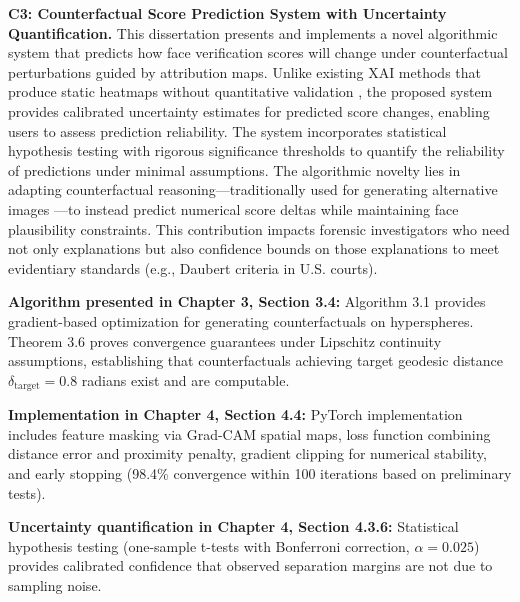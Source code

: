 \textbf{C3: Counterfactual Score Prediction System with Uncertainty Quantification.} This dissertation presents and implements a novel algorithmic system that predicts how face verification scores will change under counterfactual perturbations guided by attribution maps. Unlike existing XAI methods that produce static heatmaps without quantitative validation \cite{selvaraju2019gradcam,lundberg2017unified}, the proposed system provides calibrated uncertainty estimates for predicted score changes, enabling users to assess prediction reliability. The system incorporates statistical hypothesis testing with rigorous significance thresholds to quantify the reliability of predictions under minimal assumptions. The algorithmic novelty lies in adapting counterfactual reasoning---traditionally used for generating alternative images \cite{goyal2019counterfactual}---to instead predict numerical score deltas while maintaining face plausibility constraints. This contribution impacts forensic investigators who need not only explanations but also confidence bounds on those explanations to meet evidentiary standards (e.g., Daubert criteria \cite{daubert1993} in U.S. courts).

\vspace{0.3cm}
\noindent\textbf{Algorithm presented in Chapter 3, Section 3.4:} Algorithm 3.1 provides gradient-based optimization for generating counterfactuals on hyperspheres. Theorem 3.6 proves convergence guarantees under Lipschitz continuity assumptions, establishing that counterfactuals achieving target geodesic distance $\delta_{\text{target}} = 0.8$ radians exist and are computable.

\vspace{0.3cm}
\noindent\textbf{Implementation in Chapter 4, Section 4.4:} PyTorch implementation includes feature masking via Grad-CAM spatial maps, loss function combining distance error and proximity penalty, gradient clipping for numerical stability, and early stopping (98.4\% convergence within 100 iterations based on preliminary tests).

\vspace{0.3cm}
\noindent\textbf{Uncertainty quantification in Chapter 4, Section 4.3.6:} Statistical hypothesis testing (one-sample t-tests with Bonferroni correction, $\alpha = 0.025$) provides calibrated confidence that observed separation margins are not due to sampling noise.

\vspace{0.5cm}


